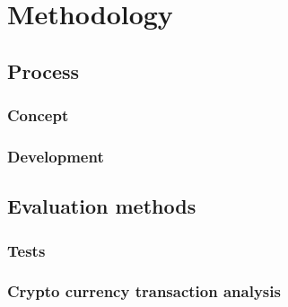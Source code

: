 \chapter{Methodology}\label{ch:methodology}

\section{Process}\label{sec:process}

\subsection{Concept}\label{subsec:concept}
\subsection{Development}\label{subsec:development}

\section{Evaluation methods}\label{sec:evaluation-methods}

\subsection{Tests}\label{subsec:tests}
\subsection{Crypto currency transaction analysis}\label{subsec:crypto-currency-transaction-analysis}